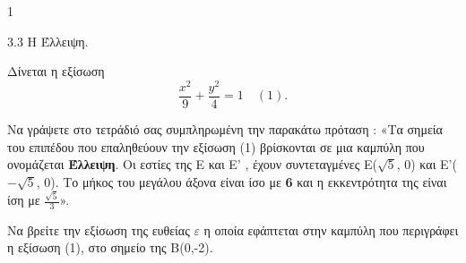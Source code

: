\begin{ylh}{1}
    \item 3.3 Η Έλλειψη.
\end{ylh}
Δίνεται η εξίσωση \[ \frac{x^2}{9} + \frac{y^2}{4} = 1 \quad (1). \]
\begin{alist}
\item Να γράψετε στο τετράδιό σας συμπληρωμένη την παρακάτω πρόταση :
    «Τα σημεία του επιπέδου που επαληθεύουν την εξίσωση (1) βρίσκονται σε μια
    καμπύλη που ονομάζεται \textbf{Έλλειψη}. Οι εστίες της E και E' , έχουν συντεταγμένες
    E($\sqrt{5}$, $0$) και E'($-\sqrt{5}$, $0$). Το μήκος του μεγάλου άξονα είναι ίσο με \textbf{6} και η
    εκκεντρότητα της είναι ίση με $\frac{\sqrt{5}}{3}$». 
\item Να βρείτε την εξίσωση της ευθείας $\varepsilon$ η οποία εφάπτεται στην καμπύλη που
    περιγράφει η εξίσωση (1), στο σημείο της B(0,-2). 
\end{alist}